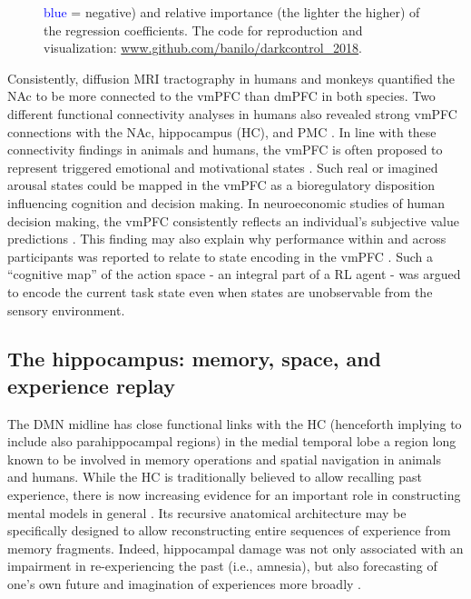 \documentclass[10pt,letterpaper]{article}
\begin{document}
\begin{figure}[!htbp]
{    \textcolor{blue}{blue} = negative) and relative importance (the lighter the higher) of the regression coefficients.
  The code for reproduction and visualization: \url{www.github.com/banilo/darkcontrol_2018}.}
  \label{fig:dmn}
\end{figure}

Consistently, diffusion MRI tractography in humans and monkeys
\citep{croxson2005quantitative}
quantified the NAc to
be more connected to the vmPFC than dmPFC in both species.
Two different functional connectivity analyses in humans also revealed
strong vmPFC connections
with the NAc, hippocampus (HC),
and PMC \citep{bzdok2015subspecialization}.
%
In line with these connectivity findings in animals and humans,
the vmPFC is often proposed to represent triggered
emotional and motivational states \citep{damasio1996somatic}.
Such real or imagined arousal states could be mapped in the vmPFC
as a bioregulatory disposition influencing cognition
and decision making.
In neuroeconomic studies of human decision making,
the vmPFC consistently reflects an individual’s subjective
value predictions
\citep{behrens2008associative}. This finding
may also explain why performance within and across participants
was reported to relate to state encoding in the vmPFC \citep{Schuck2016}.
Such a ``cognitive map'' of the action space - an integral part of a RL
agent -
was argued to encode
the current task state even when states are unobservable from
the sensory environment.

\subsection{The hippocampus: memory, space, and experience replay}
The DMN midline has close functional links
with the HC (henceforth implying to include also parahippocampal regions)
in the medial temporal lobe \citep{vincet2006, shannon2013morning} \textemdash
a region long known to be involved in
memory operations and spatial navigation in animals and humans.
While the HC
is traditionally believed to allow recalling past experience,
there is now increasing evidence for an important role
in constructing mental models in general
\citep{maguire2016, schacter2007remembering, gelbard2008internally, Javadi2017,
boyer2008evolutionary}.
Its recursive anatomical architecture
may be specifically designed to allow reconstructing
entire sequences of experience from memory fragments.
Indeed,
hippocampal damage was
not only associated with an impairment in re-experiencing the past (i.e., amnesia),
but also forecasting of one's own future and
imagination of experiences more broadly \citep{hassabis2007patients}.
\end{document}
